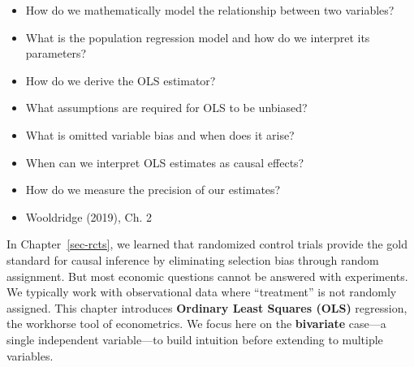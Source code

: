 \documentclass[
  letterpaper,
  DIV=11,
  numbers=noendperiod]{scrreprt}
\providecommand{\tightlist}{%
  \setlength{\itemsep}{0pt}\setlength{\parskip}{0pt}}
\begin{document}
\begin{tcolorbox}[enhanced jigsaw, arc=.35mm, bottomrule=.15mm, bottomtitle=1mm, breakable, colback=white, colbacktitle=quarto-callout-tip-color!10!white, colframe=quarto-callout-tip-color-frame, coltitle=black, left=2mm, leftrule=.75mm, opacityback=0, opacitybacktitle=0.6, rightrule=.15mm, title=\textcolor{quarto-callout-tip-color}{\faLightbulb}\hspace{0.5em}{\textbf{Key Questions}}, titlerule=0mm, toprule=.15mm, toptitle=1mm]

\begin{itemize}
\tightlist
\item
  How do we mathematically model the relationship between two variables?
\item
  What is the population regression model and how do we interpret its
  parameters?
\item
  How do we derive the OLS estimator?
\item
  What assumptions are required for OLS to be unbiased?
\item
  What is omitted variable bias and when does it arise?
\item
  When can we interpret OLS estimates as causal effects?
\item
  How do we measure the precision of our estimates?
\end{itemize}

\end{tcolorbox}

\begin{tcolorbox}[enhanced jigsaw, arc=.35mm, bottomrule=.15mm, bottomtitle=1mm, breakable, colback=white, colbacktitle=quarto-callout-note-color!10!white, colframe=quarto-callout-note-color-frame, coltitle=black, left=2mm, leftrule=.75mm, opacityback=0, opacitybacktitle=0.6, rightrule=.15mm, title=\textcolor{quarto-callout-note-color}{\faInfo}\hspace{0.5em}{\textbf{Suggested Readings}}, titlerule=0mm, toprule=.15mm, toptitle=1mm]

\begin{itemize}
\tightlist
\item
  Wooldridge (2019), Ch. 2
\end{itemize}

\end{tcolorbox}

In Chapter~\ref{sec-rcts}, we learned that randomized control trials
provide the gold standard for causal inference by eliminating selection
bias through random assignment. But most economic questions cannot be
answered with experiments. We typically work with observational data
where ``treatment'' is not randomly assigned. This chapter introduces
\textbf{Ordinary Least Squares (OLS)} regression, the workhorse tool of
econometrics. We focus here on the \textbf{bivariate} case---a single
independent variable---to build intuition before extending to multiple
variables.
\end{document}
